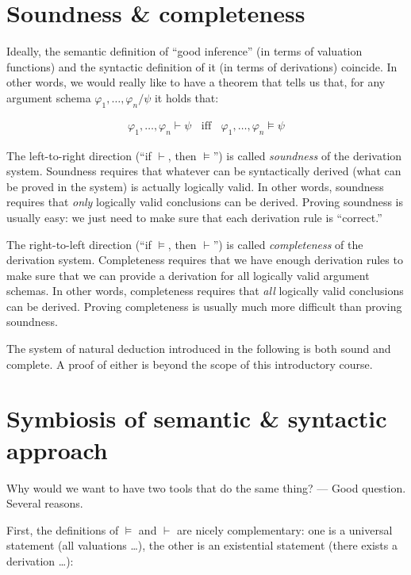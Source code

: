 \documentclass[nobib,nofonts]{tufte-handout}
\begin{document}
\section{Soundness \& completeness}

Ideally, the semantic definition of ``good inference'' (in terms of valuation functions) and the syntactic definition of it (in terms of derivations) coincide.
In other words, we would really like to have a theorem that tells us that, for any argument schema $\varphi_{1}, \dots, \varphi_{n} / \psi$ it holds that:

\begin{align*}
  \varphi_{1}, \dots, \varphi_{n} \vdash \psi \ \ \ \
  \text{iff} \ \ \ \
  \varphi_{1}, \dots, \varphi_{n} \models \psi
\end{align*}

The left-to-right direction (``if $\vdash$, then $\models$'') is called \emph{soundness} of the derivation system.
Soundness requires that whatever can be syntactically derived (what can be proved in the system) is actually logically valid.
In other words, soundness requires that \emph{only} logically valid conclusions can be derived.
Proving soundness is usually easy: we just need to make sure that each derivation rule is ``correct.''

The right-to-left direction (``if $\models$, then $\vdash$'') is called \emph{completeness} of the derivation system.
Completeness requires that we have enough derivation rules to make sure that we can provide a derivation for all logically valid argument schemas.
In other words, completeness requires that \emph{all} logically valid conclusions can be derived.
Proving completeness is usually much more difficult than proving soundness.

The system of natural deduction introduced in the following is both sound and complete.
A proof of either is beyond the scope of this introductory course.

\section{Symbiosis of semantic \& syntactic approach}

Why would we want to have two tools that do the same thing? ---
Good question.
Several reasons.

First, the definitions of $\models$ and $\vdash$ are nicely complementary: one is a universal statement (all valuations \dots), the other is an existential statement (there exists a derivation \dots):
\end{document}
